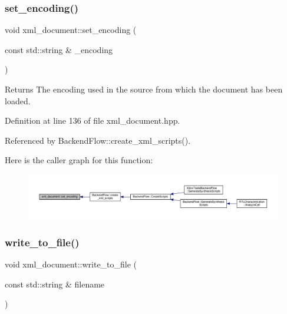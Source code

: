 \subsubsection{\texorpdfstring{set\+\_\+encoding()}{set\_encoding()}}
{\footnotesize\ttfamily void xml\+\_\+document\+::set\+\_\+encoding (\begin{DoxyParamCaption}\item[{const std\+::string \&}]{\+\_\+encoding }\end{DoxyParamCaption})\hspace{0.3cm}{\ttfamily [inline]}}

\begin{DoxyReturn}{Returns}
The encoding used in the source from which the document has been loaded. 
\end{DoxyReturn}


Definition at line 136 of file xml\+\_\+document.\+hpp.



Referenced by Backend\+Flow\+::create\+\_\+xml\+\_\+scripts().

Here is the caller graph for this function\+:
\nopagebreak
\begin{figure}[H]
\begin{center}
\leavevmode
\includegraphics[width=350pt]{d8/dee/classxml__document_a9542af1b1e91bdbde492ff3213fadef3_icgraph}
\end{center}
\end{figure}
\mbox{\label{classxml__document_a82df368faa79a46d8f4b9e635b5bcfac}} 
\subsubsection{\texorpdfstring{write\+\_\+to\+\_\+file()}{write\_to\_file()}}
{\footnotesize\ttfamily void xml\+\_\+document\+::write\+\_\+to\+\_\+file (\begin{DoxyParamCaption}\item[{const std\+::string \&}]{filename }\end{DoxyParamCaption})\hspace{0.3cm}{\ttfamily [inline]}}



